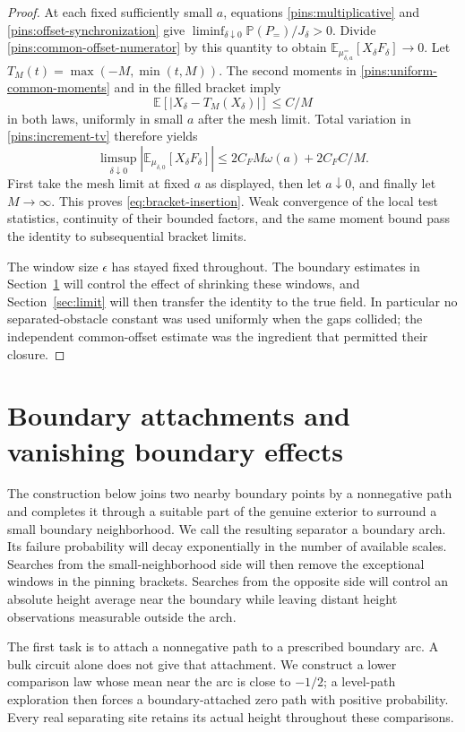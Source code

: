 \documentclass[11pt]{article}
\newcommand{\E}{\mathbb E}
\newcommand{\Prob}{\mathbb P}
\theoremstyle{definition}
\theoremstyle{remark}
\numberwithin{equation}{section}
\begin{document}
\begin{proof}
At each fixed sufficiently small $a$, equations
\eqref{pins:multiplicative} and \eqref{pins:offset-synchronization}
give $\liminf_{\delta\downarrow0}\Prob(P_=)/J_\delta>0$.
Divide \eqref{pins:common-offset-numerator} by this quantity to obtain
$\E_{\mu_{\delta,a}^{=}}[X_\delta F_\delta]\to0$.
Let $T_M(t)=\max(-M,\min(t,M))$.  The second moments in
\eqref{pins:uniform-common-moments} and in the filled bracket imply
\[
 \E[|X_\delta-T_M(X_\delta)|]\le C/M
\]
in both laws, uniformly in small $a$ after the mesh limit.  Total
variation in \eqref{pins:increment-tv} therefore yields
\[
 \limsup_{\delta\downarrow0}
       |\E_{\mu_{\delta,0}}[X_\delta F_\delta]|
 \le 2C_F M\omega(a)+2C_F C/M.
\]
First take the mesh limit at fixed $a$ as displayed, then let
$a\downarrow0$, and finally let $M\to\infty$.  This proves
\eqref{eq:bracket-insertion}.  Weak convergence of the local test
statistics, continuity of their bounded factors, and the same moment
bound pass the identity to subsequential bracket limits.

The window size $\epsilon$ has stayed fixed throughout.  The boundary
estimates in Section~\ref{sec:boundary} will control the effect of
shrinking these windows, and Section~\ref{sec:limit} will then transfer
the identity to the true field.
In particular no separated-obstacle constant was used uniformly when
the gaps collided; the independent common-offset estimate was the
ingredient that permitted their closure.
\end{proof}

\section{Boundary attachments and vanishing boundary effects}
\label{sec:boundary}

The construction below joins two nearby boundary points by a nonnegative
path and completes it through a suitable part of the genuine exterior
to surround a small boundary neighborhood.  We call the resulting
separator a boundary arch.  Its failure probability will decay
exponentially in the number of available scales.  Searches from the
small-neighborhood side will then remove the exceptional windows in the
pinning brackets.  Searches from the opposite side will control an
absolute height average near the boundary while leaving distant height
observations measurable outside the arch.

The first task is to attach a nonnegative path to a prescribed boundary
arc.  A bulk circuit alone does not give that attachment.  We construct
a lower comparison law whose mean near the arc is close to $-1/2$;
a level-path exploration then forces a boundary-attached zero path with
positive probability.  Every real separating site retains its actual
height throughout these comparisons.
\end{document}
